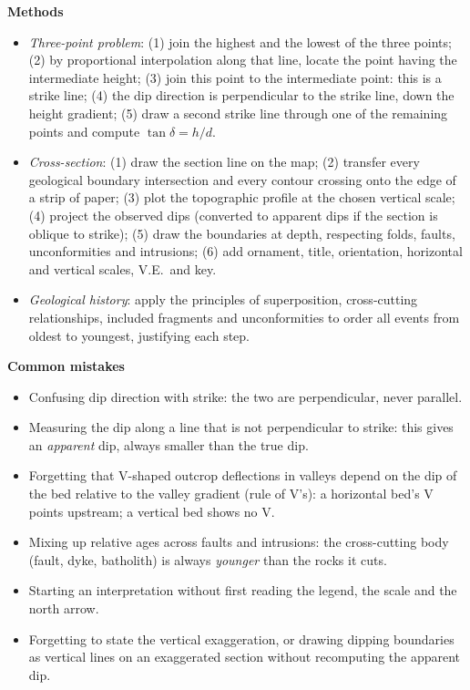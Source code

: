 \documentclass[11pt]{article}
\begin{document}
\begin{bilan}
\textbf{Methods}
\begin{itemize}
\item \emph{Three-point problem}: (1) join the highest and the lowest of the three points; (2) by proportional interpolation along that line, locate the point having the intermediate height; (3) join this point to the intermediate point: this is a strike line; (4) the dip direction is perpendicular to the strike line, down the height gradient; (5) draw a second strike line through one of the remaining points and compute $\tan\delta = h/d$.
\item \emph{Cross-section}: (1) draw the section line on the map; (2) transfer every geological boundary intersection and every contour crossing onto the edge of a strip of paper; (3) plot the topographic profile at the chosen vertical scale; (4) project the observed dips (converted to apparent dips if the section is oblique to strike); (5) draw the boundaries at depth, respecting folds, faults, unconformities and intrusions; (6) add ornament, title, orientation, horizontal and vertical scales, V.E.\ and key.
\item \emph{Geological history}: apply the principles of superposition, cross-cutting relationships, included fragments and unconformities to order all events from oldest to youngest, justifying each step.
\end{itemize}

\textbf{Common mistakes}
\begin{itemize}
\item Confusing dip direction with strike: the two are perpendicular, never parallel.
\item Measuring the dip along a line that is not perpendicular to strike: this gives an \emph{apparent} dip, always smaller than the true dip.
\item Forgetting that V-shaped outcrop deflections in valleys depend on the dip of the bed relative to the valley gradient (rule of V's): a horizontal bed's V points upstream; a vertical bed shows no V.
\item Mixing up relative ages across faults and intrusions: the cross-cutting body (fault, dyke, batholith) is always \emph{younger} than the rocks it cuts.
\item Starting an interpretation without first reading the legend, the scale and the north arrow.
\item Forgetting to state the vertical exaggeration, or drawing dipping boundaries as vertical lines on an exaggerated section without recomputing the apparent dip.
\end{itemize}


\end{bilan}
\end{document}
